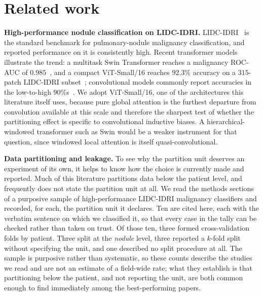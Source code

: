 \documentclass{ieeeaccess}
\newcommand{\vcite}[1]{\cite{#1}}
\begin{document}
\section{Related work}
\label{sec:related}
\textbf{High-performance nodule classification on LIDC-IDRI.} LIDC-IDRI~\vcite{armato2011} is the
standard benchmark for pulmonary-nodule malignancy classification, and reported performance on it is
consistently high. Recent transformer models illustrate the trend: a multitask Swin Transformer
reaches a malignancy ROC-AUC of $0.985$~\vcite{jin2025}, and a compact ViT-Small/16 reaches $92.3\%$
accuracy on a $315$-patch LIDC-IDRI subset~\vcite{thakur2026}; convolutional models commonly report accuracies
in the low-to-high $90\%$s~\vcite{alshabi2019gated,procan2021,xiao2020ens}. We adopt ViT-Small/16,
one of the architectures this literature itself uses, because pure global attention is the furthest
departure from convolution available at this scale and therefore the sharpest test of whether the
partitioning effect is specific to convolutional inductive biases. A hierarchical-windowed
transformer such as Swin would be a weaker instrument for that question, since windowed local
attention is itself quasi-convolutional.

\textbf{Data partitioning and leakage.} To see why the partition unit deserves an experiment of its
own, it helps to know how the choice is currently made and reported. Much of this literature
partitions data below the patient level, and frequently does not state the partition unit at all.
We read the methods sections of a purposive sample of high-performance LIDC-IDRI malignancy
classifiers and recorded, for each, the partition unit it declares. Ten are cited here, each with the
verbatim sentence on which we classified it, so that every case in the tally can be checked rather
than taken on trust. Of those ten, three formed cross-validation folds by patient. Three split at the
\emph{nodule} level, three reported a $k$-fold split without specifying the unit, and one described
no split procedure at all. The sample is purposive rather than systematic, so these counts describe
the studies we read and are not an estimate of a field-wide rate; what they establish is that
partitioning below the patient, and not reporting the unit, are both common enough to find
immediately among the best-performing papers.
\end{document}
